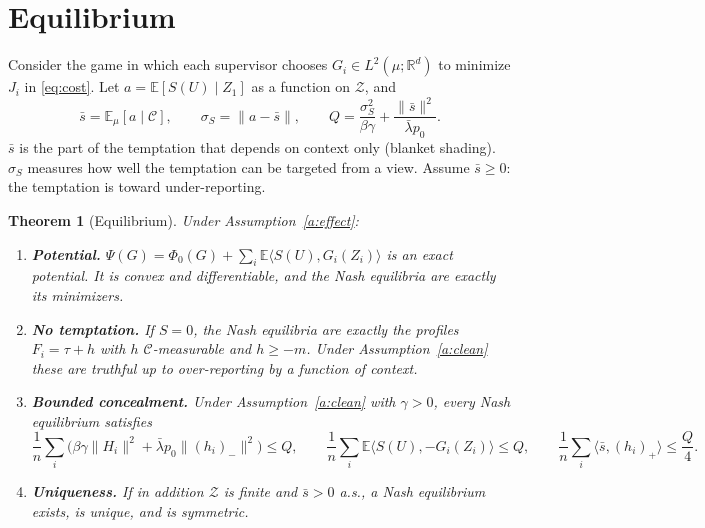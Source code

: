 \documentclass[11pt]{article}
\newtheorem{theorem}{Theorem}
\theoremstyle{definition}
\theoremstyle{remark}
\newcommand{\E}{\mathbb{E}}
\newcommand{\R}{\mathbb{R}}
\newcommand{\cC}{\mathcal{C}}
\newcommand{\cZ}{\mathcal{Z}}
\newcommand{\ip}[2]{\langle #1,#2\rangle}
\newcommand{\norm}[1]{\lVert #1\rVert}
\newcommand{\negp}[1]{(#1)_{-}}
\newcommand{\posp}[1]{(#1)_{+}}
\newcommand{\lbar}{\bar\lambda}
\begin{document}
\section{Equilibrium}\label{sec:eq}

Consider the game in which each supervisor chooses $G_i\in L^2(\mu;\R^d)$ to minimize $J_i$ in \eqref{eq:cost}. Let $a=\E[S(U)\mid Z_1]$ as a function on $\cZ$, and
\[
\bar s=\E_\mu[a\mid\cC],\qquad \sigma_S=\norm{a-\bar s},\qquad
Q=\frac{\sigma_S^2}{\beta\gamma}+\frac{\norm{\bar s}^2}{\lbar p_0}.
\]
$\bar s$ is the part of the temptation that depends on context only (blanket shading). $\sigma_S$ measures how well the temptation can be targeted from a view. Assume $\bar s\ge0$: the temptation is toward under-reporting.

\begin{theorem}[Equilibrium]\label{t:eq}
Under Assumption~\ref{a:effect}:
\begin{enumerate}[label=(\alph*),leftmargin=2em]
\item \textbf{Potential.} $\Psi(G)=\Phi_0(G)+\sum_i\E\ip{S(U)}{G_i(Z_i)}$ is an exact potential. It is convex and differentiable, and the Nash equilibria are exactly its minimizers.
\item \textbf{No temptation.} If $S=0$, the Nash equilibria are exactly the profiles $F_i=\tau+h$ with $h$ $\cC$-measurable and $h\ge-m$. Under Assumption~\ref{a:clean} these are truthful up to over-reporting by a function of context.
\item \textbf{Bounded concealment.} Under Assumption~\ref{a:clean} with $\gamma>0$, every Nash equilibrium satisfies
\[
\frac1n\sum_i\Big(\beta\gamma\norm{H_i}^2+\lbar p_0\norm{\negp{h_i}}^2\Big)\le Q,\qquad
\frac1n\sum_i\E\ip{S(U)}{-G_i(Z_i)}\le Q,\qquad
\frac1n\sum_i\ip{\bar s}{\posp{h_i}}\le \frac Q4 .
\]
\item \textbf{Uniqueness.} If in addition $\cZ$ is finite and $\bar s>0$ a.s., a Nash equilibrium exists, is unique, and is symmetric.
\end{enumerate}
\end{theorem}
\end{document}
